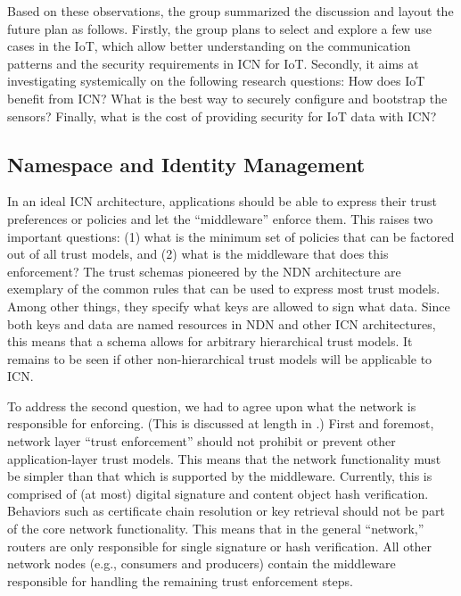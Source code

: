 Based on these observations, the group summarized the discussion and layout the future plan as follows. Firstly, the group plans to  select and explore a few use cases in the IoT, which allow better understanding on the communication patterns and the security requirements in ICN for IoT. Secondly, it aims at investigating systemically on the following research questions: How does IoT benefit from ICN? What is the best way to securely configure and bootstrap the sensors? Finally, what is the cost of providing security for IoT data with ICN?

\subsection{Namespace and Identity Management}
In an ideal ICN architecture, applications should be able to express their trust preferences or policies and let the ``middleware'' enforce them. This raises two important questions: (1) what is the minimum set of policies that can be factored out of all trust models, and (2) what is the middleware that does this enforcement? The trust schemas pioneered by the NDN architecture \cite{schemas} are exemplary of the common rules that can be used to express most trust models. Among other things, they specify what keys are allowed to sign what data. Since both keys and data are named resources in NDN and other ICN architectures, this means that a schema allows for arbitrary hierarchical trust models. It remains to be seen if other non-hierarchical trust models will be applicable to ICN.

To address the second question, we had to agree upon what the network is responsible for enforcing. (This is discussed at length in \cite{trust}.)
First and foremost, network layer ``trust enforcement'' should not prohibit or prevent other application-layer trust models. This means that the network functionality must be simpler than that which is supported by the middleware. Currently, this is comprised of (at most) digital signature and content object hash verification. Behaviors such as certificate chain resolution or key retrieval should not be part of the core network functionality. This means that in the general ``network,'' routers are only responsible for single signature or hash verification. All other network nodes (e.g., consumers and producers) contain the middleware responsible for handling the remaining trust enforcement steps.

